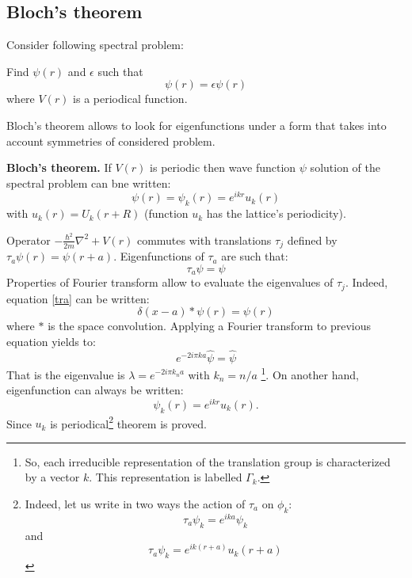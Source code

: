 \documentclass[12pt]{book}
\begin{document}
\subsection{Bloch's theorem}\label{sectheobloch}
Consider following spectral problem:
\begin{prob}
Find $\psi(r)$ and $\epsilon$ such that
\begin{equation}
[-\frac{\hbar^2}{2m}\nabla^2+V(r)]\psi(r)=\epsilon\psi(r)
\end{equation}
where $V(r)$ is a periodical function.
\end{prob}
Bloch's theorem\cite{ma:equad:Dautray5,ph:solid:Kittel67,ph:physt:Diu89}
allows to look for eigenfunctions under a form
that takes into account symmetries of considered problem.
\begin{thm}\label{theobloch}{\bf Bloch's theorem.} If $V(r)$ is periodic then
  wave function $\psi$ solution of the spectral problem can bne written:
\begin{equation}
\psi(r)=\psi_k(r)=e^{ikr}u_k(r)
\end{equation}
with $ u_k(r)=U_k(r+R)$ (function $u_k$ has the lattice's periodicity).  
\end{thm}
\begin{pf}
Operator $-\frac{\hbar^2}{2m}\nabla^2+V(r)$ commutes with translations
$\tau_j$ defined by $\tau_a\psi(r)=\psi(r+a)$.
Eigenfunctions of $\tau_a$ are such that:
\begin{equation}
\tau_a\psi=\psi
\label{tra}
\end{equation}
Properties of Fourier transform allow to evaluate the
eigenvalues of $\tau_j$. Indeed, equation \ref{tra} can be written:
\begin{equation}
\delta(x-a)*\psi(r)=\psi(r)
\end{equation}
where $*$ is the space convolution. Applying a Fourier transform to previous
equation yields to:
\begin{equation}
e^{-2i\pi ka}\hat{\psi}=\hat{\psi}
\end{equation}
That is the eigenvalue is $\lambda=e^{-2i\pi k_na}$ with $k_n=n/a$
\footnote{%
So, each irreducible representation of
the translation group is characterized by a vector $k$. This representation is
labelled $\Gamma_k$.}.%
On another hand, eigenfunction can always be written:
\begin{equation}
\psi_k(r)=e^{ikr}u_k(r).
\end{equation}
Since $u_k$ is periodical\footnote{%
Indeed, let us write in two ways the action of $\tau_a$ on $\phi_k$:
\begin{equation}
\tau_a\psi_k=e^{ika}\psi_k
\end{equation}
and
\begin{equation}
\tau_a\psi_k=e^{ik(r+a)}u_k(r+a)
\end{equation}
}%
theorem is proved.
\end{pf}
\end{document}
